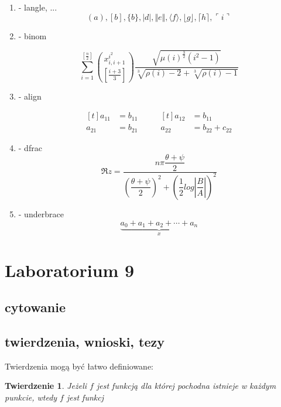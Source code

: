 \documentclass{article}
\newtheorem{theorem}{Twierdzenie}[section]
\begin{document}
\begin{enumerate}[label=\underline{Przykład \arabic{enumi}}, wide=0pt]
\item - langle, ...
	\[
		(a),
		[b],
		\{b\},
		|d|,
		\Vert e \Vert,
		\langle f \rangle,
		\lfloor g \rfloor,
		\lceil h \rceil,
		\ulcorner i \urcorner	
	\]

\item - binom

\begin{equation*}
	\sum_{i=1}^{[\frac{n}{2}]}
	\binom{x^{i^2}_{i,i+1}}{[\frac{i+3}{3}]}	
	\frac{
		\sqrt{\mu(i)^{\frac{3}{2}}(i^2-1)}}
		{\sqrt[3]{\rho(i)-2}+\sqrt[3]{\rho(i)-1}}
\end{equation*}

\item - align

\begin{equation}
\begin{aligned}[t]
    a_{11} & = b_{11} \\
    a_{21} & = b_{21} 
\end{aligned}
\qquad
\begin{aligned}[t]
    a_{12} & = b_{11}\\
    a_{22} & = b_{22}+c_{22}
\end{aligned}
\end{equation}

\item - dfrac
$$
	\Re z = \dfrac
	{n\pi \dfrac
			{\theta + \psi}
			{2}}
	{\left( \dfrac
			{\theta + \psi}
			{2}\right)^2 
		+ \left( \dfrac{1}{2}log
		  	\left| \dfrac{B}{A} \right|
		  \right)^2 
	}
$$

\item - underbrace
$$
	\underbrace{a_0 + a_1 + a_2 + \cdots + a_n}_x
$$

\end{enumerate}

\section{Laboratorium 9}
\subsection{cytowanie}
\lipsum*[10] \cite{Bhavani}
\lipsum*[10] \cite{Gumanski} %

\subsection{twierdzenia, wnioski, tezy}

Twierdzenia mogą być łatwo definiowane:
\begin{theorem}
	Jeżeli $f$ jest funkcją dla której pochodna istnieje w każdym punkcie, wtedy $f$ jest funkcj
\end{theorem}
\end{document}
